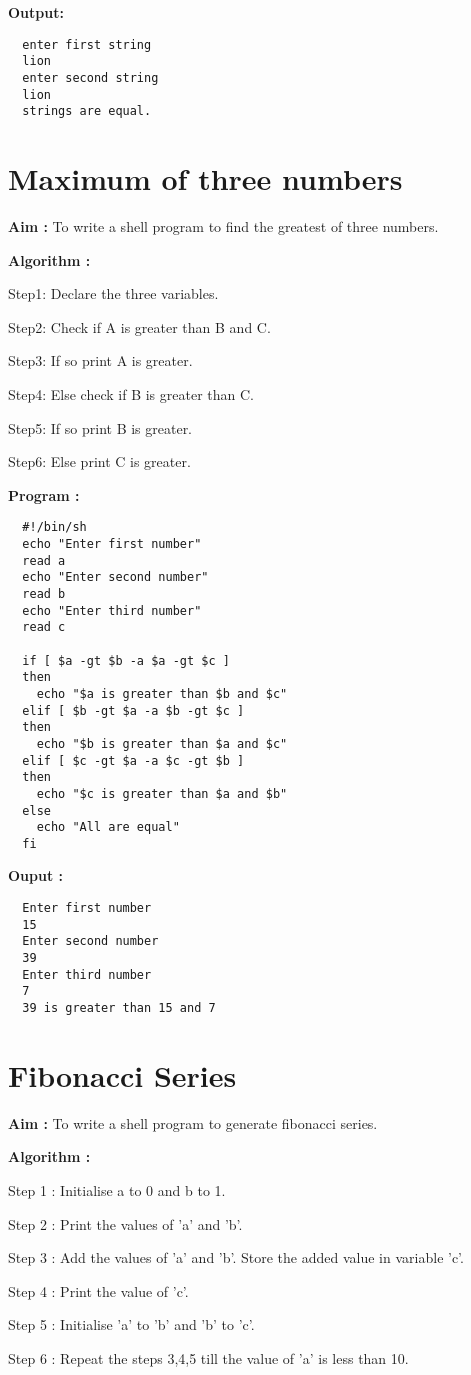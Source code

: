 \documentclass[journal,onecolumn]{IEEEtran}
\begin{document}
\textbf{Output:}
\begin{verbatim}
  enter first string
  lion
  enter second string
  lion
  strings are equal.
\end{verbatim}


\section{Maximum of three numbers}
\textbf{Aim : } To write a shell program to find the greatest of three numbers.

\textbf{Algorithm : }
\begin{list}{}{}
  \item Step1: Declare the three variables.
  \item Step2: Check if A is greater than B and
        C.
  \item Step3: If so print A is greater.
  \item Step4: Else check if B is greater than
        C.
  \item Step5: If so print B is greater.
  \item Step6: Else print C is greater.
\end{list}

\textbf{Program : }
\begin{verbatim}
  #!/bin/sh
  echo "Enter first number"
  read a
  echo "Enter second number"
  read b
  echo "Enter third number"
  read c

  if [ $a -gt $b -a $a -gt $c ]
  then
    echo "$a is greater than $b and $c"
  elif [ $b -gt $a -a $b -gt $c ]
  then
    echo "$b is greater than $a and $c"
  elif [ $c -gt $a -a $c -gt $b ]
  then
    echo "$c is greater than $a and $b"
  else
    echo "All are equal"
  fi
\end{verbatim}

\textbf{Ouput :}
\begin{verbatim}
  Enter first number
  15
  Enter second number
  39
  Enter third number
  7 
  39 is greater than 15 and 7
\end{verbatim}

\section{Fibonacci Series}
\textbf{Aim : } To write a shell program to generate fibonacci series.

\textbf{Algorithm : }
\begin{list}{}{}
  \item Step 1 : Initialise a to 0 and b to
        1.
  \item Step 2 : Print the values of 'a'
        and 'b'.
  \item Step 3 : Add the values of 'a' and 'b'. Store the added value in
        variable 'c'.
  \item Step 4 : Print the value of 'c'.
  \item Step 5 : Initialise 'a' to 'b' and 'b' to 'c'.
  \item Step 6 : Repeat the steps 3,4,5 till the value of 'a' is less than 10.
\end{list}
\end{document}
